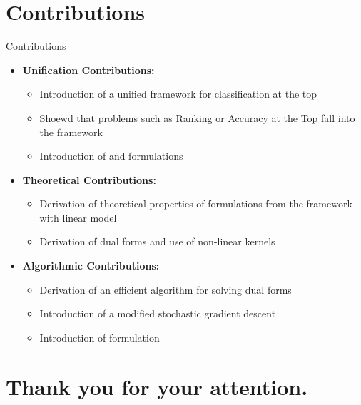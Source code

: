 \documentclass[10pt, aspectratio=169]{beamer}
\begin{document}
\section{Contributions}

\begin{frame}{Contributions}
  \begin{itemize}
    \item \textbf{Unification Contributions:}
    \begin{itemize}
      \item Introduction of a unified framework for classification at the top
      \item Shoewd that problems such as Ranking or Accuracy at the Top fall into the framework
      \item Introduction of \PatMat and \PatMatNP formulations
    \end{itemize}
    \item \textbf{Theoretical Contributions:}
    \begin{itemize}      
      \item Derivation of theoretical properties of formulations from the framework with linear model
      \item Derivation of dual forms and use of non-linear kernels
    \end{itemize}
    \item \textbf{Algorithmic Contributions:}
    \begin{itemize}
      \item Derivation of an efficient algorithm for solving dual forms
      \item Introduction of a modified stochastic gradient descent
      \item Introduction of \DeepTopPush formulation
    \end{itemize}
  \end{itemize}
\end{frame}

\section{Thank you for your attention.}
\end{document}
